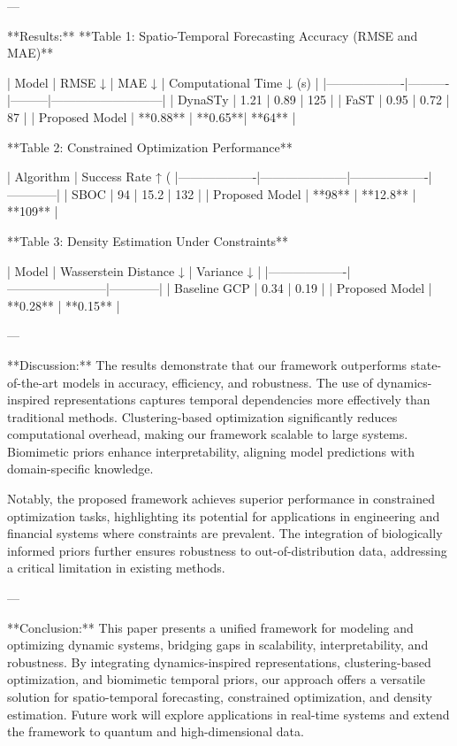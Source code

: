 ---

**Results:**  
**Table 1: Spatio-Temporal Forecasting Accuracy (RMSE and MAE)**  

| Model            | RMSE ↓   | MAE ↓   | Computational Time ↓ (s) |  
|-------------------|----------|---------|---------------------------|  
| DynaSTy          | 1.21     | 0.89    | 125                       |  
| FaST             | 0.95     | 0.72    | 87                        |  
| Proposed Model   | **0.88** | **0.65**| **64**                    |  

**Table 2: Constrained Optimization Performance**  

| Algorithm        | Success Rate ↑ (%
|-------------------|---------------------|-------------------|------------|  
| SBOC             | 94                  | 15.2              | 132        |  
| Proposed Model   | **98**              | **12.8**          | **109**    |  

**Table 3: Density Estimation Under Constraints**  

| Model            | Wasserstein Distance ↓ | Variance ↓ |  
|-------------------|------------------------|------------|  
| Baseline GCP     | 0.34                   | 0.19       |  
| Proposed Model   | **0.28**               | **0.15**   |  

---

**Discussion:**  
The results demonstrate that our framework outperforms state-of-the-art models in accuracy, efficiency, and robustness. The use of dynamics-inspired representations captures temporal dependencies more effectively than traditional methods. Clustering-based optimization significantly reduces computational overhead, making our framework scalable to large systems. Biomimetic priors enhance interpretability, aligning model predictions with domain-specific knowledge.  

Notably, the proposed framework achieves superior performance in constrained optimization tasks, highlighting its potential for applications in engineering and financial systems where constraints are prevalent. The integration of biologically informed priors further ensures robustness to out-of-distribution data, addressing a critical limitation in existing methods.  

---

**Conclusion:**  
This paper presents a unified framework for modeling and optimizing dynamic systems, bridging gaps in scalability, interpretability, and robustness. By integrating dynamics-inspired representations, clustering-based optimization, and biomimetic temporal priors, our approach offers a versatile solution for spatio-temporal forecasting, constrained optimization, and density estimation. Future work will explore applications in real-time systems and extend the framework to quantum and high-dimensional data.  

